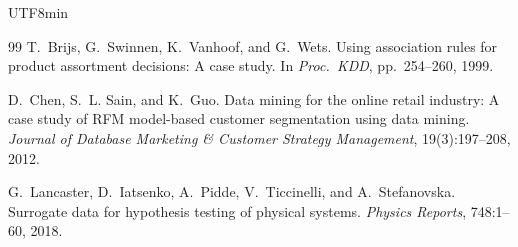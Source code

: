\documentclass[11pt,a4paper]{article}
\begin{document}
\begin{CJK}{UTF8}{min}
\begin{thebibliography}{99}
T.~Brijs, G.~Swinnen, K.~Vanhoof, and G.~Wets.
\newblock Using association rules for product assortment decisions: A case study.
\newblock In \emph{Proc.\ KDD}, pp.\ 254--260, 1999.

D.~Chen, S.~L. Sain, and K.~Guo.
\newblock Data mining for the online retail industry: A case study of {RFM} model-based customer segmentation using data mining.
\newblock \emph{Journal of Database Marketing \& Customer Strategy Management}, 19(3):197--208, 2012.

G.~Lancaster, D.~Iatsenko, A.~Pidde, V.~Ticcinelli, and A.~Stefanovska.
\newblock Surrogate data for hypothesis testing of physical systems.
\newblock \emph{Physics Reports}, 748:1--60, 2018.

\end{thebibliography}

\end{CJK}
\end{document}
